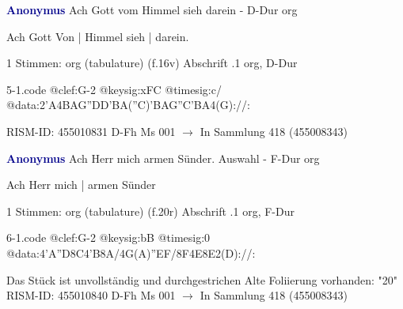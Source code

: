 \documentclass[twocolumn]{book}
\begin{document}
\newline \par \vspace{7pt} \textcolor{darkblue}{\textbf{Anonymus  }}
\newline Ach Gott vom Himmel sieh darein - D-Dur
\newline org
\newline \begin{itshape}[f.16v, at left:] Ach Gott Von | Himmel sieh | darein.\end{itshape} 
\newline \textcolor{darkblue}{}  1 Stimmen: org (tabulature)  (f.16v)
\newline Abschrift
.1  org, D-Dur  
\begin{filecontents*}{5-1.code}
@clef:G-2
@keysig:xFC
@timesig:c/
@data:2'A4BAG''DD'BA(''C)'BAG''C'BA4(G)://:
\end{filecontents*}
\newline
%
\newline RISM-ID: 455010831
\newline D-Fh  Ms 001
\newline $\rightarrow$ In Sammlung 418 (455008343)
      
\newline \par \vspace{7pt} \textcolor{darkblue}{\textbf{Anonymus  }}
\newline Ach Herr mich armen Sünder. Auswahl - F-Dur
\newline org
\newline \begin{itshape}[f.20r, at left:] Ach Herr mich | armen Sünder\end{itshape} 
\newline \textcolor{darkblue}{}  1 Stimmen: org (tabulature)  (f.20r)
\newline Abschrift
.1  org, F-Dur  
\begin{filecontents*}{6-1.code}
@clef:G-2
@keysig:bB
@timesig:0
@data:4'A''D8C4'B8A/4G(A)''EF/8F4E8E2(D)://:
\end{filecontents*}
\newline
%
\newline Das Stück ist unvollständig und durchgestrichen
\newline Alte Foliierung vorhanden: "20"
\newline RISM-ID: 455010840
\newline D-Fh  Ms 001
\newline $\rightarrow$ In Sammlung 418 (455008343)
      
\end{document}

